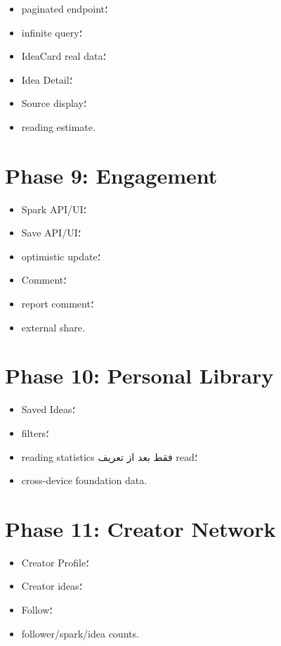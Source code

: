 \begin{itemize}
  \item paginated endpoint؛
  \item infinite query؛
  \item IdeaCard real data؛
  \item Idea Detail؛
  \item Source display؛
  \item reading estimate.
\end{itemize}

\section{Phase 9: Engagement}

\begin{itemize}
  \item Spark API/UI؛
  \item Save API/UI؛
  \item optimistic update؛
  \item Comment؛
  \item report comment؛
  \item external share.
\end{itemize}

\section{Phase 10: Personal Library}

\begin{itemize}
  \item Saved Ideas؛
  \item filters؛
  \item reading statistics فقط بعد از تعریف read؛
  \item cross-device foundation data.
\end{itemize}

\section{Phase 11: Creator Network}

\begin{itemize}
  \item Creator Profile؛
  \item Creator ideas؛
  \item Follow؛
  \item follower/spark/idea counts.
\end{itemize}

